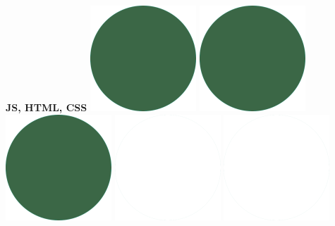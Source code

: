 \documentclass[]{commands}
\begin{document}
\begin{aside}
\textbf{JS, HTML, CSS}\hfill
\includegraphics[scale=0.11]{img/IPSGreenDots.png}
\includegraphics[scale=0.11]{img/IPSGreenDots.png}
\includegraphics[scale=0.11]{img/IPSGreenDots.png}
\includegraphics[scale=0.11]{img/WhiteDots.png}
\includegraphics[scale=0.11]{img/WhiteDots.png}


\end{aside}
\end{document}
